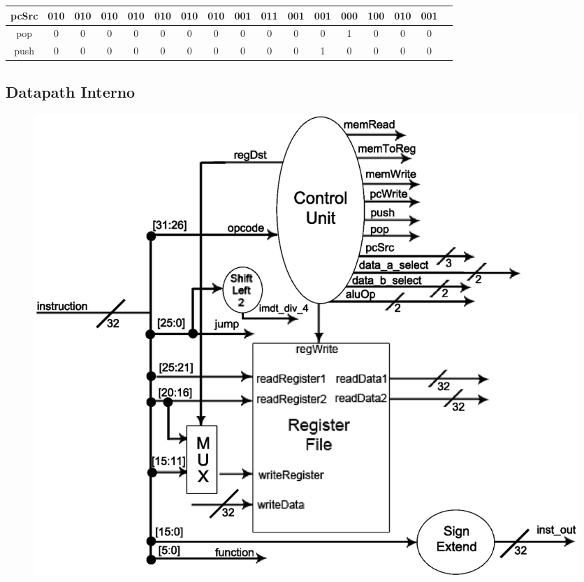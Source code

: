 \begin{center}
\begin{longtable}[pos]{| c | c | c | c | c | c | c | c | c | c | c | c | c | c | c | c | c |}
            \small pcSrc 			& \small 010 & \small 010   & \small 010 & \small 010 & \small 010 & \small 010 & \small 010 & \small 001 & \small 011 & \small 001 & \small 001 & \small 000 & \small 100 & \small 010 & \small 001\\ \hline
            
            \small pop 				& 0   & 0   & 0   & 0   & 0   & 0   & 0   & 0   & 0   & 0   & 0   & 1   & 0  & 0 & 0\\ \hline
            \small push 			& 0   & 0   & 0   & 0   & 0   & 0   & 0   & 0   & 0   & 0   & 1   & 0   & 0  & 0 & 0\\ \hline

		\end{longtable}
	\end{center}
   
   \newpage
	
	\subsection{Datapath Interno}
	
	\begin{figure}[h!]
		\begin{center}
		\includegraphics[scale=0.8]{./datapath/stage2.eps}
		\end{center}
	\end{figure}
